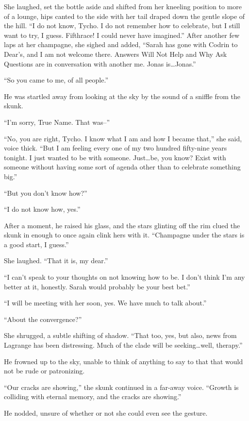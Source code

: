 She laughed, set the bottle aside and shifted from her kneeling position to more of a lounge, hips canted to the side with her tail draped down the gentle slope of the hill. ``I do not know, Tycho. I do not remember how to celebrate, but I still want to try, I guess. Fifthrace! I could never have imagined.'' After another few laps at her champagne, she sighed and added, ``Sarah has gone with Codrin to Dear's, and I am not welcome there. Answers Will Not Help and Why Ask Questions are in conversation with another me. Jonas is\ldots Jonas.''

``So you came to me, of all people.''

He was startled away from looking at the sky by the sound of a sniffle from the skunk.

``I'm sorry, True Name. That was--''

``No, you are right, Tycho. I know what I am and how I became that,'' she said, voice thick. ``But I am feeling every one of my two hundred fifty-nine years tonight. I just wanted to be with someone. Just\ldots be, you know? Exist with someone without having some sort of agenda other than to celebrate something big.''

``But you don't know how?''

``I do not know how, yes.''

After a moment, he raised his glass, and the stars glinting off the rim clued the skunk in enough to once again clink hers with it. ``Champagne under the stars is a good start, I guess.''

She laughed. ``That it is, my dear.''

``I can't speak to your thoughts on not knowing how to be. I don't think I'm any better at it, honestly. Sarah would probably be your best bet.''

``I will be meeting with her soon, yes. We have much to talk about.''

``About the convergence?''

She shrugged, a subtle shifting of shadow. ``That too, yes, but also, news from Lagrange has been distressing. Much of the clade will be seeking\ldots well, therapy.''

He frowned up to the sky, unable to think of anything to say to that that would not be rude or patronizing.

``Our cracks are showing,'' the skunk continued in a far-away voice. ``Growth is colliding with eternal memory, and the cracks are showing.''

He nodded, unsure of whether or not she could even see the gesture.

